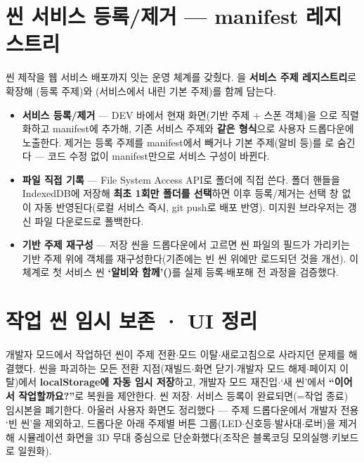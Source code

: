 \section{씬 서비스 등록/제거 --- manifest 레지스트리}
씬 제작을 웹 서비스 배포까지 잇는 운영 체계를 갖췄다. 을
\textbf{서비스 주제 레지스트리}로 확장해 (등록 주제)와
(서비스에서 내린 기본 주제)를 함께 담는다.
\begin{itemize}
  \item \textbf{서비스 등록/제거} --- DEV 바에서 현재 화면(기반 주제 + 스폰 객체)을
  으로 직렬화하고 manifest에 추가해, 기존 서비스 주제와
  \textbf{같은 형식}으로 사용자 드롭다운에 노출한다. 제거는 등록 주제를 manifest에서
  빼거나 기본 주제(알비 등)를 로 숨긴다 --- 코드 수정 없이
  manifest만으로 서비스 구성이 바뀐다.
  \item \textbf{파일 직접 기록} --- File System Access API로  폴더에
  직접 쓴다. 폴더 핸들을 IndexedDB에 저장해 \textbf{최초 1회만 폴더를 선택}하면 이후
  등록/제거는 선택 창 없이 자동 반영된다(로컬 서비스 즉시, git push로 배포 반영).
  미지원 브라우저는 갱신 파일 다운로드로 폴백한다.
  \item \textbf{기반 주제 재구성} --- 저장 씬을 드롭다운에서 고르면 씬 파일의
   필드가 가리키는 기반 주제 위에 객체를 재구성한다(기존에는 빈 씬 위에만
  로드되던 것을 개선). 이 체계로 첫 서비스 씬 \textbf{`알비와 함께'()}를
  실제 등록$\cdot$배포해 전 과정을 검증했다.
\end{itemize}

\section{작업 씬 임시 보존 · UI 정리}
개발자 모드에서 작업하던 씬이 주제 전환$\cdot$모드 이탈$\cdot$새로고침으로 사라지던
문제를 해결했다. 씬을 파괴하는 모든 전환 지점(재빌드$\cdot$화면 닫기$\cdot$개발자 모드
해제$\cdot$페이지 이탈)에서 \textbf{localStorage에 자동 임시 저장}하고, 개발자 모드
재진입$\cdot$`새 씬'에서 \textbf{``이어서 작업할까요?''}로 복원을 제안한다. 씬 저장$\cdot$%
서비스 등록이 완료되면(=작업 종료) 임시본을 폐기한다. 아울러 사용자 화면도 정리했다
--- 주제 드롭다운에서 개발자 전용 `빈 씬'을 제외하고, 드롭다운 아래 주제별 버튼
그룹(LED$\cdot$신호등$\cdot$발사대$\cdot$로버)을 제거해 시뮬레이션 화면을 3D 무대
중심으로 단순화했다(조작은 블록코딩 모의실행$\cdot$키보드로 일원화).

\smallskip
{}

